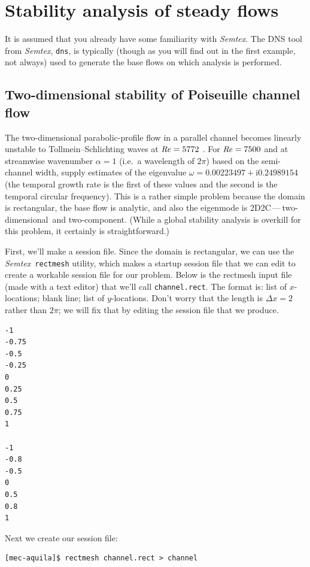 \documentclass[11pt,a4paper]{report}
\newcommand\Rey{\mbox{\textit{Re}}}
\newcommand\ci{\mathrm{i}}
\newcommand\twod{two-di\-men\-sion\-al}
\newcommand\twoc{two-com\-po\-nent}
\newcommand{\ie}{i.e.\ }
\newcommand{\Semtex}{\emph{Semtex}}
\begin{document}
\chapter{Stability analysis of steady flows}

It is assumed that you already have some familiarity with \Semtex.
The DNS tool from \Semtex, \texttt{dns}, is typically (though as you
will find out in the first example, not always) used to generate the
base flows on which analysis is performed.


\section{Two-dimensional stability of Poiseuille channel flow}

The two-dimensional parabolic-profile flow in a parallel channel
becomes linearly unstable to Tollmein--Schlichting waves at
$\Rey=5772$ \citep{ors71}.  For $\Rey=7500$ and at streamwise
wavenumber $\alpha=1$ (\ie a wavelength of $2\pi$) based on the
semi-channel width, \citet[\S\,1.4]{chqz88} supply estimates of the
eigenvalue $\omega=0.00223497+\ci 0.24989154$ (the temporal growth
rate is the first of these values and the second is the temporal
circular frequency).  This is a rather simple problem because the
domain is rectangular, the base flow is analytic, and also the
eigenmode is 2D2C\,---\,\twod\ and \twoc.  (While a global stability
analysis is overkill for this problem, it certainly is
straightforward.)

First, we'll make a session file. Since the domain is rectangular, we
can use the \Semtex\ \verb+rectmesh+ utility, which makes a startup
session file that we can edit to create a workable session file for
our problem.  Below is the rectmesh input file (made with a text
editor) that we'll call \verb+channel.rect+.  The format is: list of
$x$-locations; blank line; list of $y$-locations.  Don't worry that
the length is $\Delta x=2$ rather than $2\pi$; we will fix that by
editing the session file that we produce.

{\small
\begin{verbatim}
-1
-0.75
-0.5
-0.25
0
0.25
0.5
0.75
1

-1
-0.8
-0.5
0
0.5
0.8
1
\end{verbatim}
}

Next we create our session file:
{\small
\begin{verbatim}
[mec-aquila]$ rectmesh channel.rect > channel
\end{verbatim}
}
\end{document}
